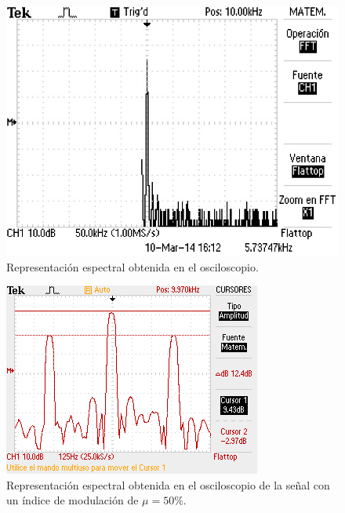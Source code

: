 \documentclass[12pt,graphicx,caption,rotating]{article}
\begin{document}
\begin{figure}
  \centering
    \includegraphics[scale=0.5]{fig2.jpg}
    \caption{Representación espectral obtenida en el osciloscopio.}
  \label{fig2}
\end{figure}

\begin{figure}
  \centering
    \includegraphics[scale=1]{fig3.png}
    \caption{Representación espectral obtenida en el osciloscopio de la señal con un índice de modulación de $\mu = 50 \%$.}
  \label{fig3}
\end{figure}
\end{document}
